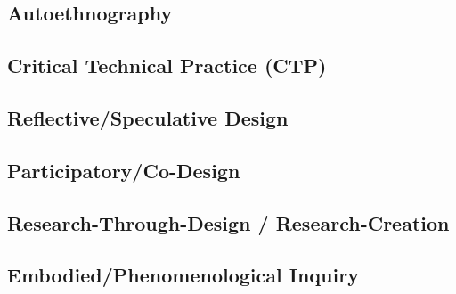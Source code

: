 \subsection{Autoethnography}
\subsection{Critical Technical Practice (CTP)}
\subsection{Reflective/Speculative Design}
\subsection{Participatory/Co-Design}
\subsection{Research-Through-Design / Research-Creation}
\subsection{Embodied/Phenomenological Inquiry}